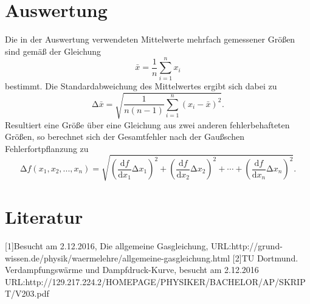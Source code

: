 \documentclass[
  parskip=half,
  bibliography=totoc,     %
  captions=tableheading,  %
  titlepage=firstiscover, %
]{scrartcl}
\begin{document}
\section{Auswertung}
\label{sec:auswertung}
Die in der Auswertung verwendeten Mittelwerte mehrfach gemessener Größen sind
gemäß der Gleichung
\begin{equation}
    \bar{x}=\frac{1}{n}\sum_{i=1}^n x_i
\end{equation}
\label{eq:formel7}
bestimmt. Die Standardabweichung des Mittelwertes ergibt sich dabei zu
\begin{equation}
    \mathup{\Delta}\bar{x}=\sqrt{\frac{1}{n(n-1)}\sum_{i=1}^n\left(x_i-\bar{x}\right)^2}.
\end{equation}
\label{eq:formel8}
Resultiert eine Größe über eine Gleichung aus zwei anderen fehlerbehafteten
Größen, so berechnet sich der Gesamtfehler nach der Gaußschen
Fehlerfortpflanzung zu
\begin{equation}
    \mathup{\Delta}f(x_1,x_2,...,x_n)=\sqrt{\left(\frac{\mathup{d}f}{\mathup{d}x_1}\mathup{\Delta}x_1\right)^2+\left(\frac{\mathup{d}f}{\mathup{d}x_2}\mathup{\Delta}x_2\right)^2+ \dotsb +\left(\frac{\mathup{d}f}{\mathup{d}x_n}\mathup{\Delta}x_n\right)^2}.
\end{equation}
\label{eq:formel9}
\section{Literatur}
[1]Besucht am 2.12.2016, Die allgemeine Gasgleichung,
URL:http://grund-wissen.de/physik/waermelehre/allgemeine-gasgleichung.html
[2]TU Dortmund. Verdampfungswärme und Dampfdruck-Kurve, besucht am 2.12.2016
URL:http://129.217.224.2/HOMEPAGE/PHYSIKER/BACHELOR/AP/SKRIPT/V203.pdf
\end{document}
